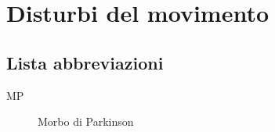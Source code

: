 \chapter{Disturbi del movimento}
\minitoc
\section*{Lista abbreviazioni}
\begin{description}
	\item[MP] Morbo di Parkinson
\end{description}
